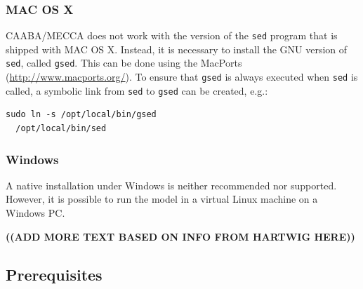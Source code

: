 \documentclass[twoside]{article}
\newcommand{\todo}[1]{{\uppercase{\bf ((#1))}}}
\begin{document}
\subsubsection{MAC OS X}

CAABA/MECCA does not work with the version of the \verb|sed| program
that is shipped with MAC OS X. Instead, it is necessary to install the
GNU version of \verb|sed|, called \verb|gsed|. This can be done using
the MacPorts (\url{http://www.macports.org/}). To ensure that
\verb|gsed| is always executed when \verb|sed| is called, a symbolic
link from \verb|sed| to \verb|gsed| can be created, e.g.:
\begin{verbatim}
sudo ln -s /opt/local/bin/gsed
  /opt/local/bin/sed
\end{verbatim}

\subsubsection{Windows}

A native installation under Windows is neither recommended nor
supported. However, it is possible to run the model in a virtual Linux
machine on a Windows PC.

\todo{add more text based on info from hartwig here}

\subsection{Prerequisites}
\end{document}
